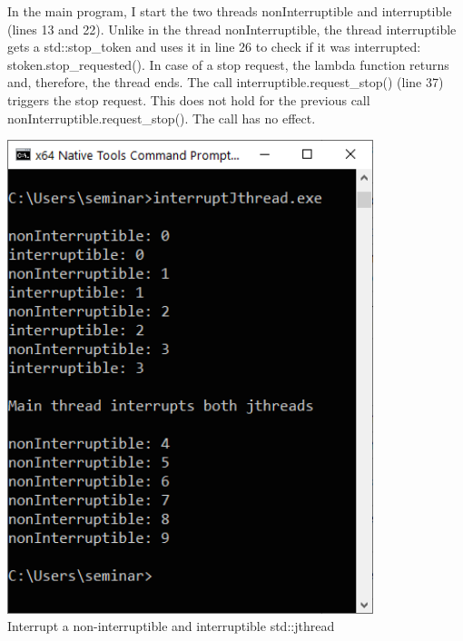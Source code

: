 In the main program, I start the two threads nonInterruptible and interruptible (lines 13 and 22). Unlike in the thread nonInterruptible, the thread interruptible gets a std::stop\_token and uses it in line 26 to check if it was interrupted: stoken.stop\_requested(). In case of a stop request, the lambda function returns and, therefore, the thread ends. The call interruptible.request\_stop() (line 37) triggers the stop request. This does not hold for the previous call nonInterruptible.request\_stop(). The call has no effect.

\begin{center}
\includegraphics[width=0.8\textwidth]{content/3/chapter6/images/27.png}\\
Interrupt a non-interruptible and interruptible std::jthread
\end{center}

\newpage

























